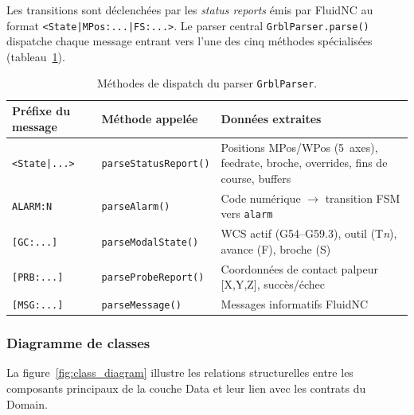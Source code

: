 \documentclass[12pt,a4paper]{report}
\newcommand{\code}[1]{\texttt{\small #1}}
\begin{document}
Les transitions sont déclenchées par les \textit{status reports} émis par FluidNC au format \code{<State|MPos:...|FS:...>}. Le parser central \code{GrblParser.parse()} dispatche chaque message entrant vers l'une des cinq méthodes spécialisées (tableau~\ref{tab:parser_methods}).

\begin{table}[H]
\centering
\caption{Méthodes de dispatch du parser \code{GrblParser}.}
\label{tab:parser_methods}
\begin{tabularx}{\textwidth}{l l X}
\toprule
Préfixe du message & Méthode appelée & Données extraites \\
\midrule
\code{<State|...>} & \code{parseStatusReport()} & Positions MPos/WPos (5~axes), feedrate, broche, overrides, fins de course, buffers \\
\code{ALARM:N} & \code{parseAlarm()} & Code numérique $\rightarrow$ transition FSM vers \code{alarm} \\
\code{[GC:...]} & \code{parseModalState()} & WCS actif (G54--G59.3), outil (T\textit{n}), avance (F), broche (S) \\
\code{[PRB:...]} & \code{parseProbeReport()} & Coordonnées de contact palpeur [X,Y,Z], succès/échec \\
\code{[MSG:...]} & \code{parseMessage()} & Messages informatifs FluidNC \\
\bottomrule
\end{tabularx}
\end{table}

\subsubsection{Diagramme de classes}

La figure~\ref{fig:class_diagram} illustre les relations structurelles entre les composants principaux de la couche Data et leur lien avec les contrats du Domain.
\end{document}

